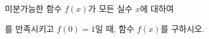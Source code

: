 \hspace*{2mm}\begin{minipage}[t]{\dimexpr\linewidth-2mm\relax}\vspace{0pt}
미분가능한 함수 $f(x)$가 모든 실수 $x$에 대하여 \par\smallskip{}\par\smallskip\noindent 를 만족시키고 $f(0)=1$일 때, 함수 $f(x)$를 구하시오.\end{minipage}
